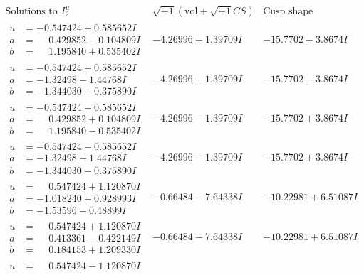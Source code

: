 \documentclass[1p]{elsarticle_modified}
\theoremstyle{definition}
\newcommand{\I}{\sqrt{-1}}
\begin{document}
$$\begin{array}{c|c|c}  
\text{Solutions to }I^u_{2}& \I (\text{vol} + \sqrt{-1}CS) & \text{Cusp shape}\\
 \hline 
\begin{aligned}
u &= -0.547424 + 0.585652 I \\
a &= \phantom{-}0.429852 - 0.104809 I \\
b &= \phantom{-}1.195840 + 0.535402 I\end{aligned}
 & -4.26996 + 1.39709 I & -15.7702 - 3.8674 I \\ \hline\begin{aligned}
u &= -0.547424 + 0.585652 I \\
a &= -1.32498 - 1.44768 I \\
b &= -1.344030 + 0.375890 I\end{aligned}
 & -4.26996 + 1.39709 I & -15.7702 - 3.8674 I \\ \hline\begin{aligned}
u &= -0.547424 - 0.585652 I \\
a &= \phantom{-}0.429852 + 0.104809 I \\
b &= \phantom{-}1.195840 - 0.535402 I\end{aligned}
 & -4.26996 - 1.39709 I & -15.7702 + 3.8674 I \\ \hline\begin{aligned}
u &= -0.547424 - 0.585652 I \\
a &= -1.32498 + 1.44768 I \\
b &= -1.344030 - 0.375890 I\end{aligned}
 & -4.26996 - 1.39709 I & -15.7702 + 3.8674 I \\ \hline\begin{aligned}
u &= \phantom{-}0.547424 + 1.120870 I \\
a &= -1.018240 + 0.928993 I \\
b &= -1.53596 - 0.48899 I\end{aligned}
 & -0.66484 - 7.64338 I & -10.22981 + 6.51087 I \\ \hline\begin{aligned}
u &= \phantom{-}0.547424 + 1.120870 I \\
a &= \phantom{-}0.413361 - 0.422149 I \\
b &= \phantom{-}0.184153 + 1.209330 I\end{aligned}
 & -0.66484 - 7.64338 I & -10.22981 + 6.51087 I \\ \hline\begin{aligned}
u &= \phantom{-}0.547424 - 1.120870 I \\

\end{aligned}
\end{array}$$
\end{document}
